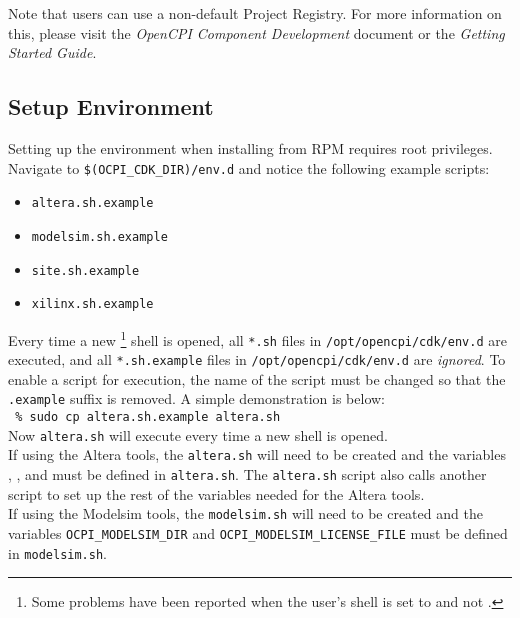 Note that users can use a non-default Project Registry. For more information on this, please visit the \textit{OpenCPI Component Development} document or the \textit{Getting Started Guide}.

\subsection{Setup Environment} \label{setenv}
\label{subsec:setup_environment}

Setting up the environment when installing from RPM requires root privileges. Navigate to \verb+$(OCPI_CDK_DIR)/env.d+ and notice the following example scripts:

\begin{itemize}
 	\item \verb+altera.sh.example+
 	\item \verb+modelsim.sh.example+
 	\item \verb+site.sh.example+
 	\item \verb+xilinx.sh.example+
\end{itemize}

Every time a new \footnote{Some problems have been reported when the user's shell is set to  and not .} shell is opened, all \verb+*.sh+ files in \verb+/opt/opencpi/cdk/env.d+ are executed, and all \verb+*.sh.example+ files in \verb+/opt/opencpi/cdk/env.d+ are \textit{ignored}. To enable a script for execution, the name of the script must be changed so that the \verb+.example+ suffix is removed. A simple demonstration is below:\\

\verb+ % sudo cp altera.sh.example altera.sh+\\

Now \verb+altera.sh+ will execute every time a new shell is opened.\\

If using the Altera tools, the \verb+altera.sh+ will need to be created and the variables , , and  must be defined in \verb+altera.sh+. The \verb+altera.sh+ script also calls another script to set up the rest of the variables needed for the Altera tools.\\

If using the Modelsim tools, the \verb+modelsim.sh+ will need to be created and the variables \verb+OCPI_MODELSIM_DIR+ and \verb+OCPI_MODELSIM_LICENSE_FILE+ must be defined in \verb+modelsim.sh+.\\


